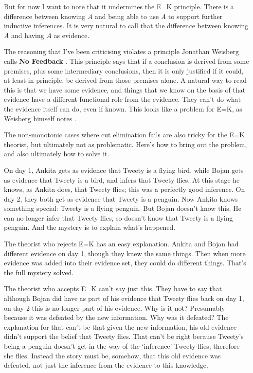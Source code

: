 \documentclass[
  11pt,
]{book}
\begin{document}
But for now I want to note that it undermines the E=K principle. There is a difference between knowing \emph{A} and being able to use \emph{A} to support further inductive inferences. It is very natural to call that the difference between knowing \emph{A} and having \emph{A} as evidence.

The reasoning that I've been criticising violates a principle Jonathan Weisberg calls \textbf{No Feedback} \citep[ 533-4]{Weisberg2010}. This principle says that if a conclusion is derived from some premises, plus some intermediary conclusions, then it is only justified if it could, at least in principle, be derived from those premises alone. A natural way to read this is that we have some evidence, and things that we know on the basis of that evidence have a different functional role from the evidence. They can't do what the evidence itself can do, even if known. This looks like a problem for E=K, as Weisberg himself notes \citeyearpar[ 536]{Weisberg2010}.

The non-monotonic cases where cut elimination fails are also tricky for the E=K theorist, but ultimately not as problematic. Here's how to bring out the problem, and also ultimately how to solve it.

On day 1, Ankita gets as evidence that Tweety is a flying bird, while Bojan gets as evidence that Tweety is a bird, and infers that Tweety flies. At this stage he knows, as Ankita does, that Tweety flies; this was a perfectly good inference. On day 2, they both get as evidence that Tweety is a penguin. Now Ankita knows something special: Tweety is a flying penguin. But Bojan doesn't know this. He can no longer infer that Tweety flies, so doesn't know that Tweety is a flying penguin. And the mystery is to explain what's happened.

The theorist who rejects E=K has an easy explanation. Ankita and Bojan had different evidence on day 1, though they knew the same things. Then when more evidence was added into their evidence set, they could do different things. That's the full mystery solved.

The theorist who accepts E=K can't say just this. They have to say that although Bojan did have as part of his evidence that Tweety flies back on day 1, on day 2 this is no longer part of his evidence. Why is it not? Presumably because it was defeated by the new information. Why was it defeated? The explanation for that can't be that given the new information, his old evidence didn't support the belief that Tweety flies. That can't be right because Tweety's being a penguin doesn't get in the way of the `inference' Tweety flies, therefore she flies. Instead the story must be, somehow, that this old evidence was defeated, not just the inference from the evidence to this knowledge.
\end{document}

